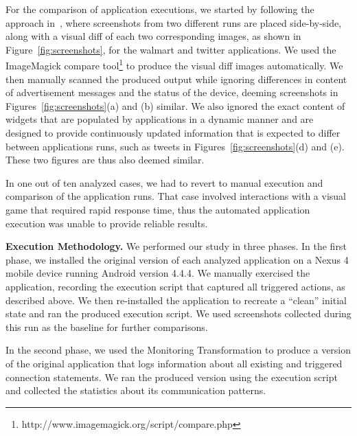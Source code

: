 For the comparison of application executions, we started by following the approach in~\cite{Hornyack:Han:Jung:Schechter:Wetherall:CCS11}, where screenshots from two different runs are placed side-by-side, 
along with a visual diff of each two corresponding images, as shown in Figure~\ref{fig:screenshots}, for 
the walmart and twitter applications. 
We used the ImageMagick compare tool\footnote{http://www.imagemagick.org/script/compare.php}
to produce the visual diff images automatically. 
We then manually scanned the produced output while ignoring differences in content of advertisement messages and the status of the device, deeming screenshots in Figures~\ref{fig:screenshots}(a) and (b) similar. 
We also ignored the exact content of widgets that are populated by applications in a dynamic manner and are designed to 
provide continuously updated information that is expected to differ between applications runs, such as tweets in Figures~\ref{fig:screenshots}(d) and (e). These two figures are thus also deemed similar.

In one out of ten analyzed cases, we had to revert to manual execution and comparison of the application runs.
That case involved interactions with a visual game that required rapid response time, 
thus the automated application execution was unable to provide reliable results. 


\vspace{0.1in}
\noindent 
{\bf Execution Methodology.}
We performed our study in three phases. In the first phase, we installed the original version of each analyzed 
application on a Nexus 4 mobile device running Android version 4.4.4.
We manually exercised the application, recording the execution script that captured all triggered actions, as described above. 
We then re-installed the application to recreate a ``clean'' initial state and ran the produced execution script.  
We used screenshots collected during this run as the baseline for further comparisons. 

In the second phase, we used the Monitoring Transformation to produce a version of the original application that logs information about all existing and triggered connection statements. We ran the produced version using the execution script and collected the statistics about its communication patterns.  

